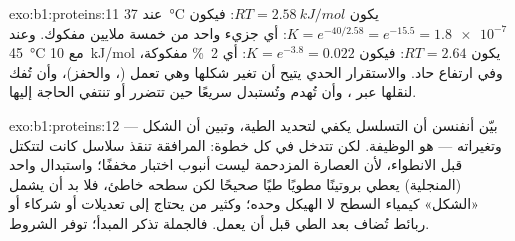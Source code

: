 \begin{solution}{exo:b1:proteins:11}
عند \qty{37}{\celsius} يكون $RT = \qty{2.58}{kJ/mol}$: فيكون
$K = e^{-40/2.58} =
e^{-15.5} = \num{1.8e-7}$: أي جزيء واحد من خمسة
ملايين مفكوك. وعند \qty{45}{\celsius} مع \qty{10}{kJ/mol} يكون
$RT = 2.64$: فيكون $K = e^{-3.8} =
0.022$: أي \qty{2}{\%} مفكوكة،
وفي ارتفاع حاد. والاستقرار الحدي يتيح  أن تغير شكلها وهي
تعمل (، والحفز)، وأن تُفك لنقلها عبر ، وأن تُهدم
وتُستبدل سريعًا حين تتضرر أو تنتفي الحاجة إليها.
\end{solution}

\begin{solution}{exo:b1:proteins:12}
بيّن أنفنسن أن التسلسل يكفي لتحديد الطية، وتبين  أن الشكل
--- وتغيراته --- هو الوظيفة. لكن  تتدخل في كل خطوة: 
المرافقة تنقذ سلاسل كانت لتتكتل قبل الانطواء، لأن العصارة المزدحمة
ليست أنبوب اختبار مخففًا؛ واستبدال واحد (المنجلية) يعطي بروتينًا مطويًا
طيًا صحيحًا لكن سطحه خاطئ، فلا بد أن يشمل «الشكل» كيمياء السطح لا
الهيكل وحده؛ وكثير من  يحتاج إلى تعديلات أو شركاء أو ربائط
تُضاف بعد الطي قبل أن يعمل. فالجملة تذكر المبدأ؛  توفر الشروط.
\end{solution}


